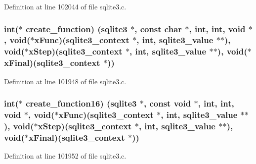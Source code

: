 Definition at line 102044 of file sqlite3.\+c.

\hypertarget{structsqlite3__api__routines_a6efc8419dc21d8abea4bd5cbc323b0fe}{}
\subsubsection[{create\+\_\+function}]{\setlength{\rightskip}{0pt plus 5cm}int($\ast$ create\+\_\+function) ({\bf sqlite3} $\ast$, const char $\ast$, int, int, void $\ast$, void($\ast$x\+Func)({\bf sqlite3\+\_\+context} $\ast$, int, sqlite3\+\_\+value $\ast$$\ast$), void($\ast$x\+Step)({\bf sqlite3\+\_\+context} $\ast$, int, sqlite3\+\_\+value $\ast$$\ast$), void($\ast$x\+Final)({\bf sqlite3\+\_\+context} $\ast$))}\label{structsqlite3__api__routines_a6efc8419dc21d8abea4bd5cbc323b0fe}


Definition at line 101948 of file sqlite3.\+c.

\hypertarget{structsqlite3__api__routines_a92b6252a9902db87b47529c31f1dc97c}{}
\subsubsection[{create\+\_\+function16}]{\setlength{\rightskip}{0pt plus 5cm}int($\ast$ create\+\_\+function16) ({\bf sqlite3} $\ast$, const void $\ast$, int, int, void $\ast$, void($\ast$x\+Func)({\bf sqlite3\+\_\+context} $\ast$, int, sqlite3\+\_\+value $\ast$$\ast$), void($\ast$x\+Step)({\bf sqlite3\+\_\+context} $\ast$, int, sqlite3\+\_\+value $\ast$$\ast$), void($\ast$x\+Final)({\bf sqlite3\+\_\+context} $\ast$))}\label{structsqlite3__api__routines_a92b6252a9902db87b47529c31f1dc97c}


Definition at line 101952 of file sqlite3.\+c.

\hypertarget{structsqlite3__api__routines_a1a912b5c2885793c368c811d6c4a1fe1}{}
